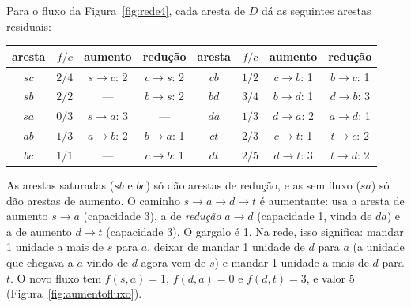 \begin{exemplo}\label{ex:residual}
Para o fluxo da Figura~\ref{fig:rede4}, cada aresta de $D$ dá as seguintes arestas residuais:
\begin{center}\small
\begin{tabular}{@{}cccc@{\qquad}cccc@{}}
\toprule
aresta & $f/c$ & aumento & redução & aresta & $f/c$ & aumento & redução\\
\midrule
$sc$ & $2/4$ & $s\to c$: 2 & $c\to s$: 2 & $cb$ & $1/2$ & $c\to b$: 1 & $b\to c$: 1\\
$sb$ & $2/2$ & --- & $b\to s$: 2 & $bd$ & $3/4$ & $b\to d$: 1 & $d\to b$: 3\\
$sa$ & $0/3$ & $s\to a$: 3 & --- & $da$ & $1/3$ & $d\to a$: 2 & $a\to d$: 1\\
$ab$ & $1/3$ & $a\to b$: 2 & $b\to a$: 1 & $ct$ & $2/3$ & $c\to t$: 1 & $t\to c$: 2\\
$bc$ & $1/1$ & --- & $c\to b$: 1 & $dt$ & $2/5$ & $d\to t$: 3 & $t\to d$: 2\\
\bottomrule
\end{tabular}
\end{center}
As arestas saturadas ($sb$ e $bc$) só dão arestas de redução, e as sem fluxo ($sa$) só dão arestas de aumento. O caminho $s\to a\to d\to t$ é aumentante: usa a aresta de aumento $s\to a$ (capacidade 3), a de \emph{redução} $a\to d$ (capacidade 1, vinda de $da$) e a de aumento $d\to t$ (capacidade 3). O gargalo é 1. Na rede, isso significa: mandar 1 unidade a mais de $s$ para $a$, deixar de mandar 1 unidade de $d$ para $a$ (a unidade que chegava a $a$ vindo de $d$ agora vem de $s$) e mandar 1 unidade a mais de $d$ para $t$. O novo fluxo tem $f(s,a)=1$, $f(d,a)=0$ e $f(d,t)=3$, e valor 5 (Figura~\ref{fig:aumentofluxo}).
\begin{figura}
\hspace{4mm}
\end{figura}
\end{exemplo}

